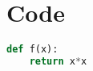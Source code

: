 \chapter{Code} \label{ch:code}

\begin{lstlisting}[language=Python]
def f(x):
    return x*x
\end{lstlisting}


